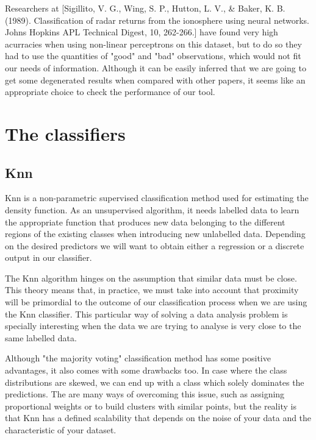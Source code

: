 Researchers at [Sigillito, V. G., Wing, S. P., Hutton, L. V., \& Baker, K. B. (1989). Classification of radar returns from the ionosphere using neural networks. Johns Hopkins APL Technical Digest, 10, 262-266.] have found very high acurracies when using non-linear perceptrons on this dataset, but to do so they had to use the quantities of "good" and "bad" observations, which would not fit our needs of information. Although it can be easily inferred that we are going to get some degenerated results when compared with other papers, it seems like an appropriate choice to check the performance of our tool. \par 

\section{The classifiers}
\subsection{Knn}

Knn is a non-parametric supervised classification method used for estimating the density function. As an unsupervised algorithm, it needs labelled data to learn the appropriate function that produces new data belonging to the different regions of the existing classes when introducing new unlabelled data. Depending on the desired predictors we will want to obtain either a regression or a discrete output in our classifier. \par

The Knn algorithm hinges on the assumption that similar data must be close. This theory means that, in practice, we must take into account that proximity will be primordial to the outcome of our classification process when we are using the Knn classifier. This particular way of solving a data analysis problem is specially interesting when the data we are trying to analyse is very close to the same labelled data. \par

Although "the majority voting" classification method has some positive advantages, it also comes with some drawbacks too. In case where the class distributions are skewed, we can end up with a class which solely dominates the predictions. The are many ways of overcoming this issue, such as assigning proportional weights or to build clusters with similar points, but the reality is that Knn has a defined scalability that depends on the noise of your data and the characteristic of your dataset. \par

